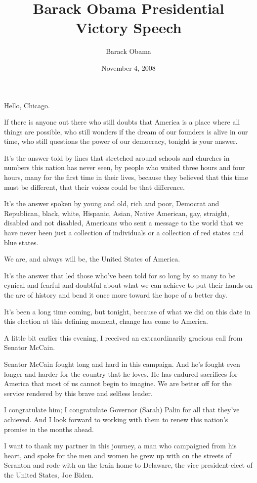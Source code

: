 \documentclass[12pt,a4paper,twocolumn]{article}
\title{Barack Obama Presidential Victory Speech}
\author{Barack Obama}
\begin{document}
\date{November 4, 2008}
\maketitle
Hello, Chicago.

If there is anyone out there who still doubts that America is a place where all things are possible, who still wonders if
the dream of our founders is alive in our time, who still questions the power of our democracy, tonight is your answer.

It's the answer told by lines that stretched around schools and churches in numbers this nation has never seen, by people
who waited three hours and four hours, many for the first time in their lives, because they believed that this time must be
different, that their voices could be that difference.

It's the answer spoken by young and old, rich and poor, Democrat and Republican, black, white, Hispanic, Asian, Native
American, gay, straight, disabled and not disabled, Americans who sent a message to the world that we have never been just a
collection of individuals or a collection of red states and blue states.

We are, and always will be, the United States of America.

It's the answer that led those who've been told for so long by so many to be cynical and fearful and doubtful about what we
can achieve to put their hands on the arc of history and bend it once more toward the hope of a better day.

It's been a long time coming, but tonight, because of what we did on this date in this election at this defining moment,
change has come to America.

A little bit earlier this evening, I received an extraordinarily gracious call from Senator McCain.

Senator McCain fought long and hard in this campaign. And he's fought even longer and harder for the country that he loves.
He has endured sacrifices for America that most of us cannot begin to imagine. We are better off for the service rendered by
this brave and selfless leader.

I congratulate him; I congratulate Governor (Sarah) Palin for all that they've achieved. And I look forward to working with
them to renew this nation's promise in the months ahead.

I want to thank my partner in this journey, a man who campaigned from his heart, and spoke for the men and women he grew up
with on the streets of Scranton and rode with on the train home to Delaware, the vice president-elect of the United States,
Joe Biden.
\end{document}
